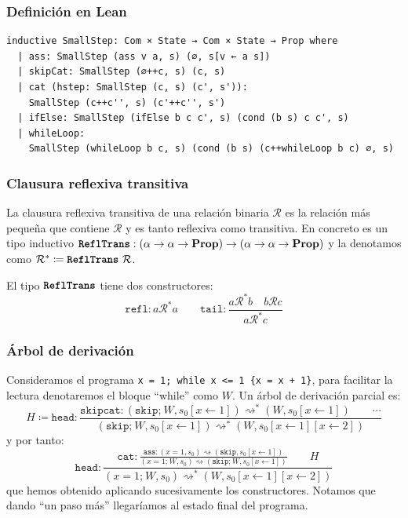 \documentclass[9pt]{beamer}
\newcommand{\funfont}[1]{\texttt{#1}}
\newcommand{\tyfont}[1]{\texttt{\textbf{#1}}}
\newcommand{\Prop}{\mathbf{Prop}}
\newcommand{\ImpConcat}[2]{{#1} \texttt{;} \ {#2}}
\newcommand{\ImpSkip}{\texttt{skip}}
\newcommand{\ImpAssign}[2]{{#1} = {#2}}
\begin{document}
\begin{frame}[fragile]
\frametitle{Definición en Lean}
\begin{verbatim}
inductive SmallStep: Com × State → Com × State → Prop where
  | ass: SmallStep (ass v a, s) (∅, s[v ← a s])
  | skipCat: SmallStep (∅++c, s) (c, s)
  | cat (hstep: SmallStep (c, s) (c', s')):
    SmallStep (c++c'', s) (c'++c'', s')
  | ifElse: SmallStep (ifElse b c c', s) (cond (b s) c c', s)
  | whileLoop:
    SmallStep (whileLoop b c, s) (cond (b s) (c++whileLoop b c) ∅, s)
\end{verbatim}

\end{frame}

\begin{frame}
\frametitle{Clausura reflexiva transitiva}
La clausura reflexiva transitiva de una relación binaria \(\mathcal{R}\) es la
  relación más pequeña que contiene \(\mathcal{R}\) y es tanto reflexiva como
  transitiva. En concreto es un tipo inductivo 
  \(\tyfont{ReflTrans}: (\alpha \to \alpha \to \Prop) \to
  (\alpha \to \alpha \to \Prop)\) y la denotamos como
  \(\mathcal{R}^* \coloneqq \tyfont{ReflTrans} \ \mathcal{R}\).

  El tipo \(\tyfont{ReflTrans}\) tiene dos constructores:
  \[
    \funfont{refl}: a \mathcal{R}^* a
    \qquad 
    \funfont{tail}: \frac{
      a \mathcal{R}^* b
      \quad b \mathcal{R} c
    }{a \mathcal{R}^* c}
  \]
\end{frame}

\begin{frame}
\frametitle{Árbol de derivación}
Consideramos el programa \texttt{x = 1; while x <= 1 \{x = x + 1\}},
  para facilitar la lectura denotaremos el bloque \enquote{while} como \(W\).
  Un árbol de derivación parcial es:
  \[
    H \coloneqq
    \funfont{head}: \displaystyle{\frac{
        \funfont{skipcat}: (\ImpConcat{\ImpSkip}{W}, s_0[x \leftarrow 1]) \rightsquigarrow^* (W, s_0[x \leftarrow 1])
        \qquad
        \cdots
      }{
        (\ImpConcat{\ImpSkip}{W}, s_0[x \leftarrow 1]) \rightsquigarrow^* (W, s_0[x \leftarrow 1][x \leftarrow 2])
      }}
  \]
  y por tanto:    
  \[
    \funfont{head}: \frac{
      \funfont{cat}: \displaystyle{\frac{
        \funfont{ass}: (\ImpAssign{x}{1}, s_0) \rightsquigarrow (\ImpSkip, s_0[x \leftarrow 1])
      }
      {(\ImpConcat{\ImpAssign{x}{1}}{W}, s_0)
      \rightsquigarrow
      (\ImpConcat{\ImpSkip}{W}, s_0[x \leftarrow 1])
      }}
      \qquad
      H
    }{
      (\ImpConcat{\ImpAssign{x}{1}}{W}, s_0) \rightsquigarrow^* (W, s_0[x \leftarrow 1][x \leftarrow 2])
    }
  \]
  que hemos obtenido aplicando sucesivamente los constructores. Notamos que
  dando \enquote{un paso más} llegaríamos al estado final del programa.
\end{frame}
\end{document}
